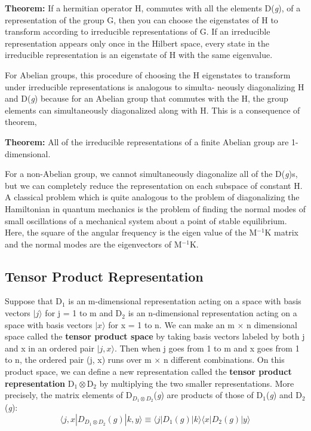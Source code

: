 \textbf{Theorem:} If a hermitian operator H, commutes with all the elements D(\textit{g}), of a representation of the group G, 
then you can choose the eigenstates of H to transform according to irreducible representations of G. 
If an irreducible representation appears only once in the Hilbert space, every state in the irreducible representation 
is an eigenstate of H with the same eigenvalue.

For Abelian groups, this procedure of choosing the H eigenstates to transform under irreducible representations is analogous to simulta-
neously diagonalizing H and D(\textit{g}) because for an Abelian group that commutes with the H, the group elements can simultaneously
diagonalized along with H. This is a consequence of theorem,

\textbf{Theorem:} All of the irreducible representations of a finite Abelian group are 1-dimensional.

For a non-Abelian group, we cannot simultaneously diagonalize all of the D(\textit{g})s, 
but we can completely reduce the representation on each subspace of constant H.
A classical problem which is quite analogous to the problem of diagonalizing the Hamiltonian  in quantum mechanics 
is the problem of finding the normal modes of small oscillations of a mechanical system about a point of stable equilibrium. 
Here, the square of the angular frequency is the eigen value of the M$^{-1}$K matrix and the normal modes are the eigenvectors of M$^{-1}$K.

\subsection{Tensor Product Representation}
Suppose that D$_1$ is an m-dimensional representation acting on a space with basis vectors $|j\rangle$ for j = 1 to m and 
D$_2$ is an n-dimensional representation acting on a space with basis vectors $|x\rangle$ for x = 1 to n. 
We can make an m $\times$ n dimensional space called the \textbf{tensor product space} by taking basis vectors labeled by both j and x  in an ordered pair $|j, x\rangle$. 
Then when j goes from 1 to m and x goes from 1 to n, the ordered pair (j, x) runs over m $\times$ n different combinations. 
On this product space, we can define a new representation called the \textbf{tensor product representation} D$_1 \otimes$D$_2$ by multiplying the two smaller representations. 
More precisely, the matrix elements of D$_{D_1 \otimes D_2}$(\textit{g}) are products of those of D$_1$(\textit{g}) and D$_2$(\textit{g}):
\begin{equation}
    \langle j, x| D_{D_1 \otimes D_2}(g)|k, y \rangle \equiv \langle j| D_1(g)|k \rangle \langle x|D_2(g)|y \rangle
\end{equation}




